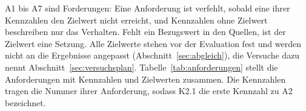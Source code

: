 A1 bis A7 sind Forderungen: Eine Anforderung ist verfehlt, sobald eine ihrer Kennzahlen den Zielwert nicht erreicht, und Kennzahlen ohne Zielwert beschreiben nur das Verhalten.
Fehlt ein Bezugswert in den Quellen, ist der Zielwert eine Setzung. Alle Zielwerte stehen vor der Evaluation fest und werden nicht an die Ergebnisse angepasst (Abschnitt~\ref{sec:abgleich}), die Versuche dazu nennt Abschnitt~\ref{sec:versuchsplan}.
Tabelle~\ref{tab:anforderungen} stellt die Anforderungen mit Kennzahlen und Zielwerten zusammen. Die Kennzahlen tragen die Nummer ihrer Anforderung, sodass K2.1 die erste Kennzahl zu A2 bezeichnet.

\begingroup
    \tabstil\setlength{\tabcolsep}{3pt}\setlength{\LTpre}{\medskipamount}\footnotesize
